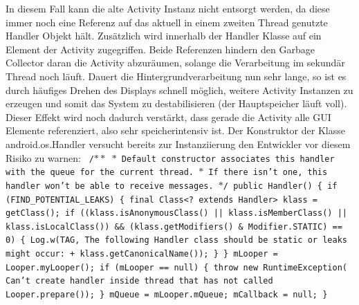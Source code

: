 \documentclass[12pt,oneside,a4paper,bibtotoc,liststotoc]{scrreprt}
\begin{document}
In diesem Fall kann die alte Activity Instanz nicht entsorgt werden, da diese immer noch eine Referenz auf das aktuell in einem zweiten Thread genutzte Handler Objekt hält. Zusätzlich wird innerhalb der Handler Klasse auf ein Element der Activity zugegriffen. Beide Referenzen hindern den Garbage Collector daran die Activity abzuräumen, solange die Verarbeitung im sekundär Thread noch läuft. Dauert die Hintergrundverarbeitung nun sehr lange, so ist es durch häufiges Drehen des Displays schnell möglich, weitere Activity Instanzen zu erzeugen und somit das System zu destabilisieren (der Hauptspeicher läuft voll). Dieser Effekt wird noch dadurch verstärkt, dass gerade die Activity alle GUI Elemente referenziert, also sehr speicherintensiv ist. Der Konstruktor der Klasse android.os.Handler versucht bereits zur Instanziierung den Entwickler vor diesem Risiko zu warnen:\newline
\texttt{ \newline
/$\ast\ast$\newline
    $\ast$ Default constructor associates this handler with the queue for the current thread.\newline
    $\ast$ If there isn't one, this handler won't be able to receive messages.\newline
    $\ast$/\newline
   public Handler() \{\newline
     if (FIND\_POTENTIAL\_LEAKS) \{ \newline
           final Class<? extends Handler> klass = getClass();\newline
           if ((klass.isAnonymousClass() || klass.isMemberClass() || klass.isLocalClass()) \&\& 
                 (klass.getModifiers() \& Modifier.STATIC) == 0) \{\newline
               Log.w(TAG, \grqq The following Handler class should be static or leaks might occur: \grqq +
                   klass.getCanonicalName());\newline
           \}\newline
       \}\newline
\newline
       mLooper = Looper.myLooper();\newline
       if (mLooper == null) \{\newline
           throw new RuntimeException(
               \grqq Can't create handler inside thread that has not called Looper.prepare()\grqq);\newline
       \}\newline
       mQueue = mLooper.mQueue;\newline
      mCallback = null;\newline
   \}\newline
}\newline
\end{document}
